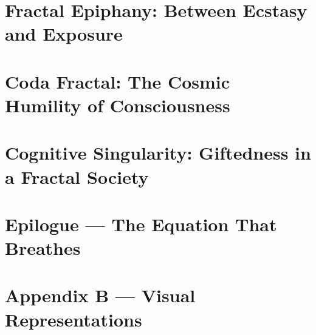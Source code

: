 \documentclass[11pt]{article}
\begin{document}
\section{Fractal Epiphany: Between Ecstasy and Exposure}


\section{Coda Fractal: The Cosmic Humility of Consciousness}


\section{Cognitive Singularity: Giftedness in a Fractal Society}


\section*{Epilogue — The Equation That Breathes}


\newpage


\newpage
\section*{Appendix B — Visual Representations}





\end{document}
